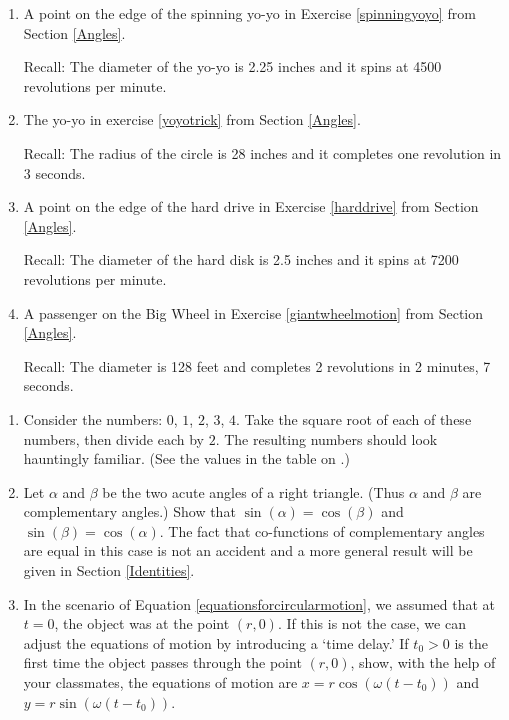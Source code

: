 \begin{enumerate}

\setcounter{enumi}{\value{HW}}

\item  \label{motionfirst} A point on the edge of the spinning yo-yo in Exercise \ref{spinningyoyo} from Section \ref{Angles}. 

Recall: The diameter of the yo-yo is 2.25 inches and it spins at 4500 revolutions per minute.

\item  The yo-yo in exercise \ref{yoyotrick} from Section \ref{Angles}.

Recall: The radius of the circle is 28 inches and it completes one revolution in 3 seconds.

\item A point on the edge of the hard drive in Exercise \ref{harddrive} from Section \ref{Angles}.

Recall:  The diameter of the hard disk is 2.5 inches and it spins at 7200 revolutions per minute.

\item  \label{motionlast} A passenger on the Big Wheel in Exercise \ref{giantwheelmotion} from Section \ref{Angles}.

Recall: The diameter is 128 feet and completes 2 revolutions in 2 minutes, 7 seconds.

\setcounter{HW}{\value{enumi}}

\end{enumerate}

\begin{enumerate}

\setcounter{enumi}{\value{HW}}

\item Consider the numbers:  $0$, $1$, $2$, $3$, $4$.  Take the square root of each of these numbers, then divide each by $2$. The resulting numbers should look hauntingly familiar. (See the values in the table on \pageref{CosineSineFacts}.) 

\item Let $\alpha$ and $\beta$ be the two acute angles of a right triangle.  (Thus $\alpha$ and $\beta$ are complementary angles.)  Show that $\sin(\alpha) = \cos(\beta)$ and $\sin(\beta) = \cos(\alpha)$.  The fact that co-functions of complementary angles are equal in this case is not an accident and a more general result will be given in Section \ref{Identities}.
\label{cofunctionforeshadowing}

\item  In the scenario of Equation \ref{equationsforcircularmotion}, we assumed that at $t=0$, the object was at the point $(r,0)$.  If this is not the case,  we can adjust the equations of motion by introducing a `time delay.'   If $t_{0} > 0$ is the first time the object passes through the point $(r,0)$, show, with the help of your classmates, the equations of motion are $x = r \cos(\omega (t - t_{0}))$ and $y = r \sin(\omega (t-t_{0}))$.

\end{enumerate}

